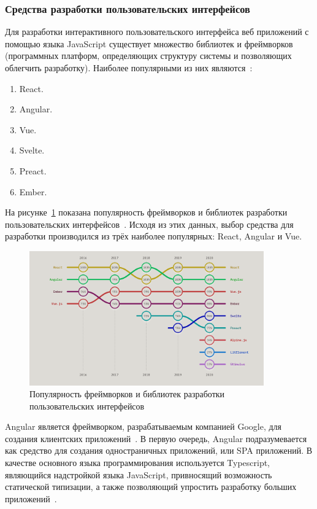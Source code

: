 \subsubsection{Средства разработки пользовательских интерфейсов}

Для разработки интерактивного пользовательского интерфейса веб приложений с помощью языка JavaScript существует множество библиотек и фреймворков (программных платформ, определяющих структуру системы и позволяющих облегчить разработку). Наиболее популярными из них являются~\cite{stateofjs}:

\begin{enumerate}
  \item React.
  \item Angular.
  \item Vue.
  \item Svelte.
  \item Preact.
  \item Ember.
\end{enumerate}

На рисунке~\ref{img:stateofjs__rank-usage} показана популярность фреймворков и библиотек разработки пользовательских интерфейсов~\cite{stateofjs}. Исходя из этих данных, выбор средства для разработки производился из трёх наиболее популярных: React, Angular и Vue.

\begin{figure}[H]
  \centering
  \includegraphics[width=0.9\textwidth]{assets/images/theoretical2/usageRank.png}
  \caption{Популярность фреймворков и библиотек разработки пользовательских интерфейсов}
  \label{img:stateofjs__rank-usage}
\end{figure}

Angular является фреймворком, разрабатываемым компанией Google, для создания клиентских приложений~\cite{angular}. В первую очередь, Angular подразумевается как средство для создания одностраничных приложений, или SPA приложений. В качестве основного языка программирования используется Typescript, являющийся надстройкой языка JavaScript, привносящий возможность статической типизации, а также позволяющий упростить разработку больших приложений~\cite{typescript}.

